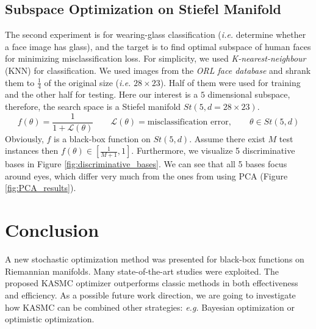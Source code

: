 \documentclass{article} %
\begin{document}
\subsection{Subspace Optimization on Stiefel Manifold}
The second experiment is for wearing-glass classification (\emph{i.e.} determine whether a face image has glass), and the target is to find optimal subspace of human faces for minimizing 
misclassification loss. For simplicity, we used \emph{K-nearest-neighbour} (KNN) for classification.  
We used images from the \emph{ORL face database} \cite{orl_database} and shrank them to $\frac{1}{4}$ of the original size (\emph{i.e.} $28\times 23$). 
Half of them were used for training and the other half for testing.  
Here our interest is a $5$ dimensional subspace, therefore, the search space is a Stiefel manifold $St(5,d=28\times 23)$.   
\begin{equation}
	f(\theta)=\frac{1}{1+\mathcal{L}(\theta)} \quad \quad  \mathcal{L}(\theta)=\text{misclassification error}, \quad \quad \theta\in St(5,d)
\end{equation}
Obviously, $f$ is a black-box function on $St(5,d)$. Assume there exist $M$ test instances then $f(\theta)\in[\frac{1}{M+1},1]$. 
Furthermore, we visualize 5 discriminative bases in Figure \ref{fig:discriminative_bases}. We can see that all 5 bases focus around eyes, which differ very much from the ones from 
using PCA (Figure \ref{fig:PCA_results}). 

\section{Conclusion}
A new stochastic optimization method was presented for black-box functions on Riemannian manifolds.
Many state-of-the-art studies were exploited. The proposed KASMC optimizer outperforms classic 
methods in both effectiveness and efficiency. As a possible future work direction, we are going to investigate 
how KASMC can be combined other strategies: \emph{e.g.} Bayesian optimization or optimistic optimization.    
\end{document}
